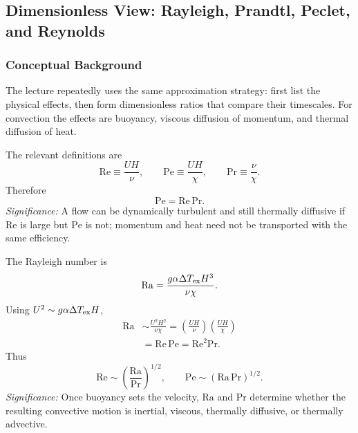 \subsection{Dimensionless View: Rayleigh, Prandtl, Peclet, and Reynolds}
\label{sec:lec08:dimensionless-view}

\subsubsection*{Conceptual Background}
The lecture repeatedly uses the same approximation strategy: first list the
physical effects, then form dimensionless ratios that compare their
timescales. For convection the effects are buoyancy, viscous diffusion of
momentum, and thermal diffusion of heat.

The relevant definitions are
\begin{equation}
    \mathrm{Re}\equiv\frac{UH}{\nu},
    \qquad
    \mathrm{Pe}\equiv\frac{UH}{\chi},
    \qquad
    \mathrm{Pr}\equiv\frac{\nu}{\chi}.
    \label{eq:lec08:re-pe-pr-definitions}
\end{equation}
Therefore
\begin{equation}
    \boxed{
    \mathrm{Pe}=\mathrm{Re}\,\mathrm{Pr}.
    }
    \label{eq:lec08:peclet-re-pr}
\end{equation}
\textit{Significance:} A flow can be dynamically turbulent and still thermally
diffusive if $\mathrm{Re}$ is large but $\mathrm{Pe}$ is not; momentum and heat
need not be transported with the same efficiency.

The Rayleigh number is
\begin{equation}
    \mathrm{Ra}
    =
    \frac{g\alpha\Delta T_{\rm ex}H^3}{\nu\chi}.
    \label{eq:lec08:rayleigh-definition}
\end{equation}
Using $U^2\sim g\alpha\Delta T_{\rm ex}H$,
\begin{align}
    \mathrm{Ra}
    &\sim
    \frac{U^2H^2}{\nu\chi}
    =
    \left(\frac{UH}{\nu}\right)
    \left(\frac{UH}{\chi}\right)  \nonumber\\
    &=
    \mathrm{Re}\,\mathrm{Pe}
    =
    \mathrm{Re}^2\mathrm{Pr}.
    \label{eq:lec08:rayleigh-re-pe}
\end{align}
Thus
\begin{equation}
    \boxed{
    \mathrm{Re}\sim\left(\frac{\mathrm{Ra}}{\mathrm{Pr}}\right)^{1/2},
    \qquad
    \mathrm{Pe}\sim\left(\mathrm{Ra}\,\mathrm{Pr}\right)^{1/2}.
    }
    \label{eq:lec08:re-pe-from-ra-pr}
\end{equation}
\textit{Significance:} Once buoyancy sets the velocity, $\mathrm{Ra}$ and
$\mathrm{Pr}$ determine whether the resulting convective motion is inertial,
viscous, thermally diffusive, or thermally advective.

